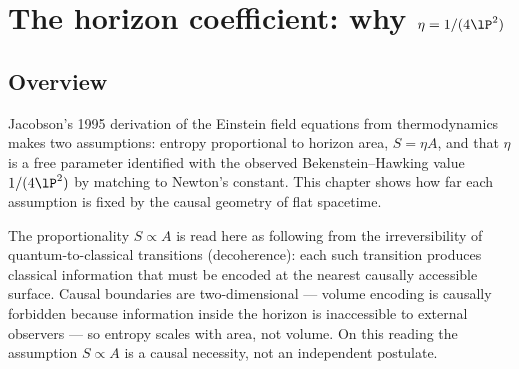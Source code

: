 
\chapter{The horizon coefficient: why $\eta=1/(4\lP^2)$}\label{ch:bekenstein}

\section*{Overview}
Jacobson's 1995 derivation of the Einstein field equations from thermodynamics~\cite{Jacobson1995} makes two assumptions: entropy proportional
to horizon area, $S=\eta A$, and that $\eta$ is a free parameter identified with the observed Bekenstein--Hawking value $1/(4\lP^2)$ by matching to
Newton's constant. This chapter shows how far each assumption is fixed by the causal geometry of flat spacetime.

The proportionality $S\propto A$ is read here as following from the irreversibility of quantum-to-classical transitions (decoherence): each such
transition produces classical information that must be encoded at the nearest causally accessible surface. Causal boundaries are two-dimensional
--- volume encoding is causally forbidden because information inside the horizon is inaccessible to external observers --- so entropy scales with
area, not volume. On this reading the assumption $S\propto A$ is a causal necessity, not an independent postulate. \interp

